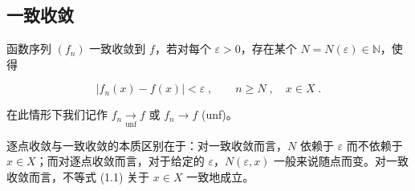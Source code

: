 \subsection*{一致收敛}

函数序列 $ (f_n) $ 一致收敛到 $ f $，若对每个 $ \varepsilon > 0 $，存在某个 $ N = N(\varepsilon) \in \mathbb{N} $，使得

\begin{equation}
|f_{n}(x)-f(x)|<\varepsilon\;,\qquad n\geq N\;,\quad x\in X\;.
\end{equation}

在此情形下我们记作 $ f_{n} \xrightarrow[\mathrm{unf}]{} f $ 或 $ f_{n} \to f $ (unf)。

逐点收敛与一致收敛的本质区别在于：对一致收敛而言，$N$ 依赖于 $\varepsilon$ 而不依赖于 $x \in X$；而对逐点收敛而言，对于给定的 $\varepsilon$，$N(\varepsilon, x)$ 一般来说随点而变。对一致收敛而言，不等式 (1.1) 关于 $x \in X$ 一致地成立。

